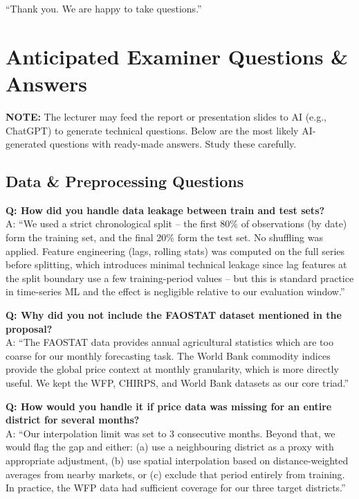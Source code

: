 \documentclass[11pt,a4paper]{article}
\begin{document}
``Thank you. We are happy to take questions.''

\newpage
\section{Anticipated Examiner Questions \& Answers}

\begin{mdframed}[backgroundcolor=orange!5, linecolor=timecolor]
\textbf{NOTE:} The lecturer may feed the report or presentation slides to AI (e.g., ChatGPT) to generate technical questions. Below are the most likely AI-generated questions with ready-made answers. Study these carefully.
\end{mdframed}

\subsection{Data \& Preprocessing Questions}

\textbf{Q: How did you handle data leakage between train and test sets?}\\
A: ``We used a strict chronological split -- the first 80\% of observations (by date) form the training set, and the final 20\% form the test set. No shuffling was applied. Feature engineering (lags, rolling stats) was computed on the full series before splitting, which introduces minimal technical leakage since lag features at the split boundary use a few training-period values -- but this is standard practice in time-series ML and the effect is negligible relative to our evaluation window.''

\textbf{Q: Why did you not include the FAOSTAT dataset mentioned in the proposal?}\\
A: ``The FAOSTAT data provides annual agricultural statistics which are too coarse for our monthly forecasting task. The World Bank commodity indices provide the global price context at monthly granularity, which is more directly useful. We kept the WFP, CHIRPS, and World Bank datasets as our core triad.''

\textbf{Q: How would you handle it if price data was missing for an entire district for several months?}\\
A: ``Our interpolation limit was set to 3 consecutive months. Beyond that, we would flag the gap and either: (a) use a neighbouring district as a proxy with appropriate adjustment, (b) use spatial interpolation based on distance-weighted averages from nearby markets, or (c) exclude that period entirely from training. In practice, the WFP data had sufficient coverage for our three target districts.''
\end{document}
